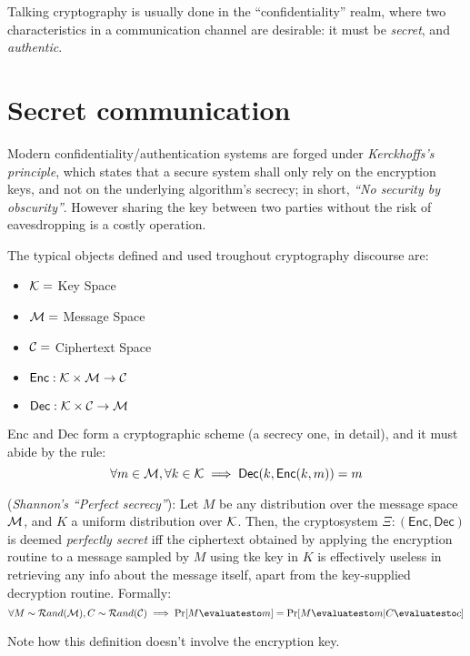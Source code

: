 
Talking cryptography is usually done in the ``confidentiality'' realm, where two characteristics in a communication channel are desirable: it must be \emph{secret}, and \emph{authentic}.

\section{Secret communication}


Modern confidentiality/authentication systems are forged under \emph{Kerckhoffs's principle}, which states that a secure system shall only rely on the encryption keys, and not on the underlying algorithm's secrecy; in short, \emph{``No security by obscurity''}. However sharing the key between two parties without the risk of eavesdropping is a costly operation.

The typical objects defined and used troughout cryptography discourse are:
\begin{itemize}
    \item $\mathcal{K} = $ Key Space
    \item $\mathcal{M} = $ Message Space
    \item $\mathcal{C} = $ Ciphertext Space
    \item $\textsf{Enc}: \mathcal{K} \times \mathcal{M} \to \mathcal{C}$
    \item $\textsf{Dec}: \mathcal{K} \times \mathcal{C} \to \mathcal{M}$
\end{itemize}

\textsf{Enc} and \textsf{Dec} form a cryptographic scheme (a secrecy one, in detail), and it must abide by the rule:
\[
    \forall m \in \mathcal{M}, \forall k \in \mathcal{K} \implies \textsf{Dec}(k, \textsf{Enc}(k, m)) = m
\]

\begin{definition}
    (\textit{Shannon's ``Perfect secrecy''}): Let $M$ be any distribution over the message space $\mathcal{M}$, and $K$ a uniform distribution over $\mathcal{K}$. Then, the cryptosystem $\Xi: (\textsf{Enc}, \textsf{Dec})$ is deemed \emph{perfectly secret} iff the ciphertext obtained by applying the encryption routine to a message sampled by $M$ using tke key in $K$ is effectively useless in retrieving any info about the message itself, apart from the key-supplied decryption routine. Formally:
    \[
        \forall M \sim \mathcal{R}and(\M), C \sim \mathcal{R}and(\C) \implies \Pr[M \evaluatesto m] = \Pr[M \evaluatesto m|C \evaluatesto c]
    \]
\end{definition}
Note how this definition doesn't involve the encryption key. %

